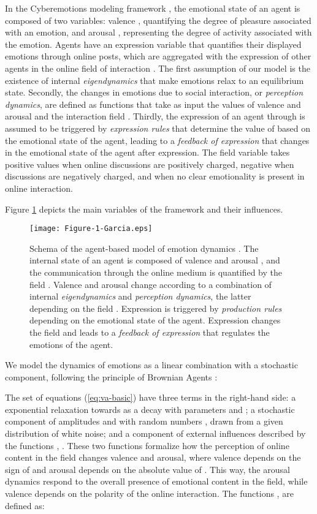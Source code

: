 \documentclass[nologo,url,11pt,a4paper]{ETHpaper}
\begin{document}
In the Cyberemotions modeling framework \cite{Schweitzer2010}, the emotional state  of an agent is composed of two variables: valence , quantifying the degree of pleasure associated with an emotion, and arousal , representing the degree of activity associated with the emotion.  
Agents have an expression variable  that quantifies their displayed emotions through online posts, which are aggregated with the expression of other agents in the online field of interaction . 
The first assumption of our model is the existence of internal \emph{eigendynamics}
that make emotions relax to an equilibrium state. 
Secondly, the changes in emotions due to social interaction, or \emph{perception dynamics}, are defined as functions that  take as input the values of valence and arousal and the interaction field .
Thirdly, the expression of an agent through  is assumed to be triggered by \emph{expression rules} that determine the value of  based on the emotional state of the agent, leading to a \emph{feedback of expression} that changes in the emotional state of the agent after expression.
The field variable  takes positive values when online discussions are positively charged, negative when discussions are negatively charged, and  when no clear emotionality is present in online interaction. 

Figure \ref{fig:dynSchema} depicts the main variables of the framework and their influences.

\begin{figure}[ht] 
\centering
\texttt{[image: Figure-1-Garcia.eps]}
\caption{Schema of the agent-based model of emotion dynamics \cite{Schweitzer2010,Garcia2011}.
The internal state of an agent is composed of valence  and arousal , and the communication through the online medium is quantified by the field . 
Valence and arousal change according to  a combination of internal \textit{eigendynamics} and \textit{perception dynamics}, the latter  depending on the field . 
Expression  is triggered by \textit{production rules} depending on the emotional state of the agent.
Expression changes the field and leads to a \textit{feedback of expression} that regulates the emotions of the agent. \label{fig:dynSchema} }  \end{figure}

We model the dynamics of emotions as a linear combination with a stochastic component, following the principle of Brownian Agents \cite{Schweitzer2003}:

The set of equations (\ref{eq:va-basic}) have three terms in the right-hand side: a exponential relaxation towards   as a decay with parameters  and ; a stochastic component  of amplitudes  and   with random numbers ,  drawn from a given distribution of white noise; and a component of external influences described by the functions , . 
These two functions formalize how the perception of online content in the field  changes valence and arousal, where valence depends on the sign of  and arousal depends on the absolute value of . This way, the arousal dynamics respond to the overall presence of emotional content in the field, while valence depends on the polarity of the online interaction.
The functions ,  are defined as:
\end{document}
